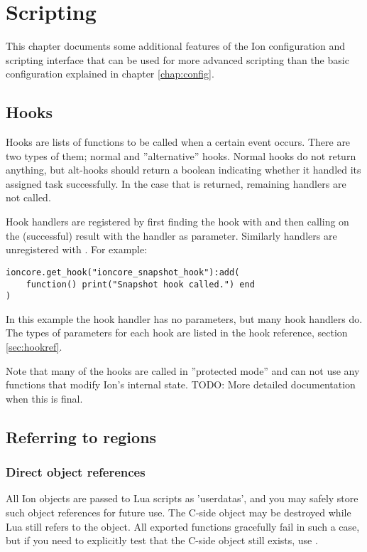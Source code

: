 
\chapter{Scripting}
\label{chap:tricks}

This chapter documents some additional features of the Ion configuration
and scripting interface that can be used for more advanced scripting than
the basic configuration explained in chapter \ref{chap:config}.

\section{Hooks}
\label{sec:hooks}

Hooks are lists of functions to be called when a certain event occurs.
There are two types of them; normal and ''alternative'' hooks. Normal
hooks do not return anything, but alt-hooks should return a boolean
indicating whether it handled its assigned task successfully. In the case
that  is returned, remaining handlers are not called.

Hook handlers are registered by first finding the hook
with  and then calling 
on the (successful) result with the handler as parameter. Similarly
handlers are unregistered with . For example:

\begin{verbatim}
ioncore.get_hook("ioncore_snapshot_hook"):add(
    function() print("Snapshot hook called.") end
)
\end{verbatim}

In this example the hook handler has no parameters, but many hook
handlers do. The types of parameters for each hook are listed in
the hook reference, section \ref{sec:hookref}.


Note that many of the hooks are called in ''protected mode'' and can not 
use any functions that modify Ion's internal state. TODO: More detailed 
documentation when this is final.

\section{Referring to regions}

\subsection{Direct object references}

All Ion objects are passed to Lua scripts as 'userdatas', and you may
safely store such object references for future use. The C-side object
may be destroyed while Lua still refers to the object. All exported
functions gracefully fail in such a case, but if you need to explicitly
test that the C-side object still exists, use .

